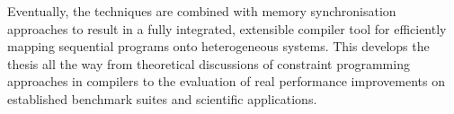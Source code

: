     Eventually, the techniques are combined with memory synchronisation
    approaches to result in a fully integrated, extensible compiler tool for
    efficiently mapping sequential programs onto heterogeneous systems.
    This develops the thesis all the way from theoretical discussions of
    constraint programming approaches in compilers to the evaluation of real
    performance improvements on established benchmark suites and scientific
    applications.











